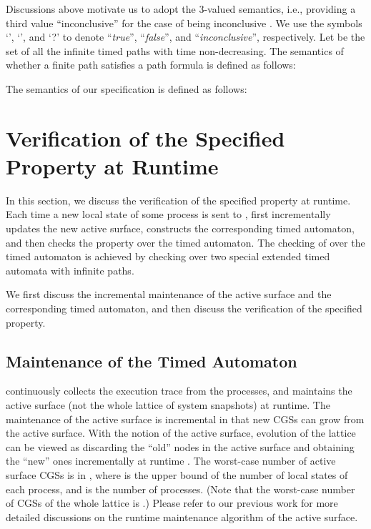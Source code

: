 \documentclass[10pt,conference,compsocconf,letterpaper]{IEEEtran}
\begin{document}
Discussions above motivate us to adopt the 3-valued semantics, i.e., providing a third value ``inconclusive'' for the case of being inconclusive \cite{Bauer11, Wei12}. We use the symbols `', `', and `?' to denote ``\textit{true}'', ``\textit{false}'', and ``\textit{inconclusive}'', respectively. Let  be the set of all the infinite timed paths with time non-decreasing. The semantics of whether a finite path  satisfies a path formula  is defined as follows:

The semantics of our specification is defined as follows:

\vspace{-0.15in}

\vspace{-0.15in}


\section{Verification of the Specified Property at Runtime} \label{sec:Detection}

In this section, we discuss the verification of the specified property at runtime. Each time a new local state of some process is sent to ,  first incrementally updates the new active surface, constructs the corresponding timed automaton, and then checks the property  over the timed automaton. The checking of  over the timed automaton is achieved by checking  over two special extended timed automata with infinite paths.

We first discuss the incremental maintenance of the active surface and the corresponding timed automaton, and then discuss the verification of the specified property.

\subsection{Maintenance of the Timed Automaton}

 continuously collects the execution trace from the processes, and maintains the active surface (not the whole lattice of system snapshots) at runtime. The maintenance of the active surface is incremental in that new CGSs can grow from the active surface. With the notion of the active surface, evolution of the lattice can be viewed as discarding the ``old'' nodes in the active surface and obtaining the ``new'' ones incrementally at runtime \cite{Yang13}. The worst-case number of active surface CGSs is in , where  is the upper bound of the number of local states of each process, and  is the number of processes. (Note that the worst-case number of CGSs of the whole lattice is .) Please refer to our previous work \cite{Yang13} for more detailed discussions on the runtime maintenance algorithm of the active surface.
\end{document}
